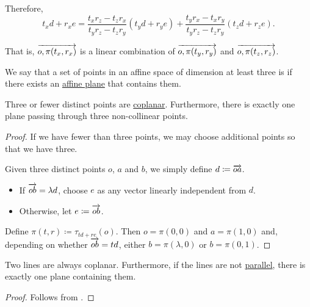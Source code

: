 \begin{defproof}
\begin{itemize}
    Therefore,
    \begin{equation*}
      t_x d + r_x e
      =
      \frac {t_x r_z - t_z r_x} {t_y r_z - t_z r_y} (t_y d + r_y e) + \frac {t_y r_x - t_x r_y} {t_y r_z - t_z r_y} (t_z d + r_z e).
    \end{equation*}

    That is, \( \overrightarrow{o,\pi(t_x,r_x)} \) is a linear combination of \( \overrightarrow{o,\pi(t_y,r_y)} \) and \( \overrightarrow{o,\pi(t_z,r_z)} \).
  \end{itemize}
\end{defproof}

\begin{definition}\label{def:coplanar_points}\mimprovised
  We say that a set of points in an affine space of dimension at least three is  if there exists an \hyperref[def:affine_plane]{affine plane} that contains them.
\end{definition}

\begin{proposition}\label{thm:triple_of_points_is_coplanar}
  Three or fewer distinct points are \hyperref[def:coplanar_points]{coplanar}. Furthermore, there is exactly one plane passing through three non-collinear points.
\end{proposition}
\begin{proof}
  If we have fewer than three points, we may choose additional points so that we have three.

  Given three distinct points \( o \), \( a \) and \( b \), we simply define \( d \coloneqq \overrightarrow{oa} \).
  \begin{itemize}
    \item If \( \overrightarrow{ob} = \lambda d \), choose \( e \) as any vector linearly independent from \( d \).
    \item Otherwise, let \( e \coloneqq \overrightarrow{ob} \).
  \end{itemize}

  Define \( \pi(t, r) \coloneqq \tau_{td + re}(o) \). Then \( o = \pi(0, 0) \) and \( a = \pi(1, 0) \) and, depending on whether \( \overrightarrow{ob} = td \), either \( b = \pi(\lambda, 0) \) or \( b = \pi(0, 1) \).
\end{proof}

\begin{proposition}\label{thm:two_lines_are_coplanar}
  Two lines are always coplanar. Furthermore, if the lines are not \hyperref[def:affine_parallelism]{parallel}, there is exactly one plane containing them.
\end{proposition}
\begin{proof}
  Follows from .
\end{proof}

